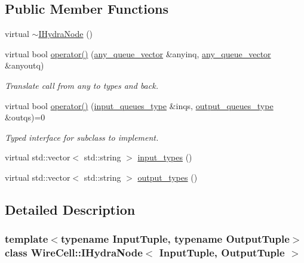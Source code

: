 \subsection*{Public Member Functions}
\begin{DoxyCompactItemize}
\item 
virtual \hyperlink{class_wire_cell_1_1_i_hydra_node_a94d501d7811fe97af9408cb539ef967b}{$\sim$\+I\+Hydra\+Node} ()
\item 
virtual bool \hyperlink{class_wire_cell_1_1_i_hydra_node_a2178e400b1539cfb77616bfb6e842fbf}{operator()} (\hyperlink{class_wire_cell_1_1_i_hydra_node_base_aab191670a86f2835da2aa07ab5e6372d}{any\+\_\+queue\+\_\+vector} \&anyinq, \hyperlink{class_wire_cell_1_1_i_hydra_node_base_aab191670a86f2835da2aa07ab5e6372d}{any\+\_\+queue\+\_\+vector} \&anyoutq)
\begin{DoxyCompactList}\small\item\em Translate call from any to types and back. \end{DoxyCompactList}\item 
virtual bool \hyperlink{class_wire_cell_1_1_i_hydra_node_a394933c1f99619e38d65282374dedd7a}{operator()} (\hyperlink{class_wire_cell_1_1_i_hydra_node_ada2ba4a3ba2716c9838ae039e475d683}{input\+\_\+queues\+\_\+type} \&inqs, \hyperlink{class_wire_cell_1_1_i_hydra_node_aeb800228236a385497609533fc0fe256}{output\+\_\+queues\+\_\+type} \&outqs)=0
\begin{DoxyCompactList}\small\item\em Typed interface for subclass to implement. \end{DoxyCompactList}\item 
virtual std\+::vector$<$ std\+::string $>$ \hyperlink{class_wire_cell_1_1_i_hydra_node_af02cf39a567f4a64d34c527b6c09febf}{input\+\_\+types} ()
\item 
virtual std\+::vector$<$ std\+::string $>$ \hyperlink{class_wire_cell_1_1_i_hydra_node_af668f59ced5931ba78e63df17b25670d}{output\+\_\+types} ()
\end{DoxyCompactItemize}


\subsection{Detailed Description}
\subsubsection*{template$<$typename Input\+Tuple, typename Output\+Tuple$>$\newline
class Wire\+Cell\+::\+I\+Hydra\+Node$<$ Input\+Tuple, Output\+Tuple $>$}

